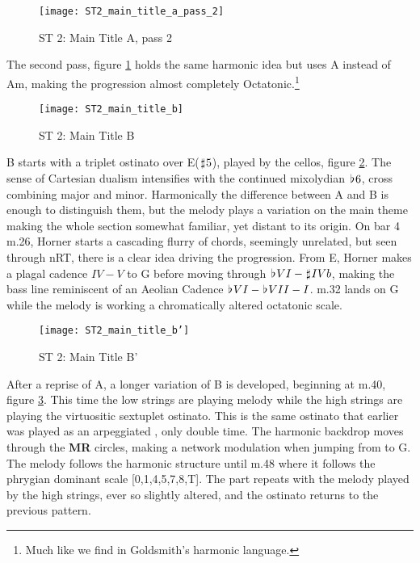 \begin{figure}[h!]
\center
\texttt{[image: ST2\_main\_title\_a\_pass\_2]}
	\caption{ST 2: Main Title A, pass 2}
	\label{ST2_main_title_a_pass_2}
\end{figure}

The second pass, figure \ref{ST2_main_title_a_pass_2} holds the same harmonic idea but uses A instead of Am, making the progression almost completely Octatonic.\footnote{Much like we find in Goldsmith's harmonic language.} 

\begin{figure}[h!]
\center
\texttt{[image: ST2\_main\_title\_b]}
	\caption{ST 2: Main Title B}
	\label{ST2_main_title_b}
\end{figure}

B starts with a triplet ostinato over E(\(\hspace*{0.18ex}\sharp\hspace*{0.18ex} 5\)), played by the cellos, figure \ref{ST2_main_title_b}. The sense of Cartesian dualism intensifies with the continued mixolydian \(\hspace*{0.18ex}\flat\hspace*{0.18ex}{6}\), cross combining major and minor. Harmonically the difference between A and B is enough to distinguish them, but the melody plays a variation on the main theme making the whole section somewhat familiar, yet distant to its origin. On bar 4 m.26, Horner starts a cascading flurry of chords, seemingly unrelated, but seen through \ac{nRT}, there is a clear idea driving the progression. From E, Horner makes a plagal cadence \(IV-V\) to G before moving through \(\hspace*{0.18ex}\flat\hspace*{0.18ex}{VI}-\hspace*{0.18ex}\sharp\hspace*{0.18ex}{IVb}\), making the bass line reminiscent of an Aeolian Cadence \(\hspace*{0.18ex}\flat\hspace*{0.18ex}{VI}-\hspace*{0.18ex}\flat\hspace*{0.18ex}{VII}-I\). m.32 lands on G while the melody is working a chromatically altered octatonic scale. 

\begin{figure}[h!]
\center
\texttt{[image: ST2\_main\_title\_b']}
	\caption{ST 2: Main Title B'}
	\label{ST2_main_title_b'}
\end{figure}
After a reprise of A, a longer variation of B is developed, beginning at m.40, figure \ref{ST2_main_title_b'}. This time the low strings are playing melody while the high strings are playing the virtuositic sextuplet ostinato. This is the same ostinato that earlier was played as an arpeggiated , only double time. The harmonic backdrop moves through the \textbf{MR} circles, making a network modulation when jumping from \fiss to G. The melody follows the harmonic structure until m.48 where it follows the phrygian dominant scale [0,1,4,5,7,8,T]. The part repeats with the melody  played by the high strings, ever so slightly altered, and the ostinato returns to the previous pattern.

